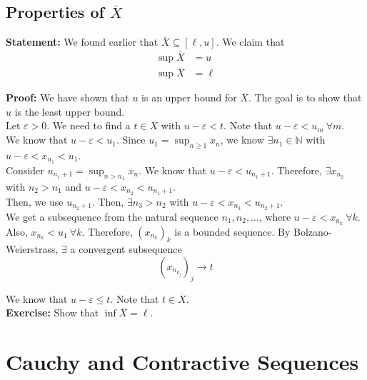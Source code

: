 \documentclass[10pt]{extarticle}
\newcommand{\N}{\mathbb{N}}
\begin{document}
  \subsection{Properties of $\overline{X}$}%
  \textbf{Statement:} We found earlier that $\overline{X} \subseteq [\ell,u]$. We claim that
    \begin{align*}
      \sup \overline{X} &= u\\
      \sup\overline{X} &= \ell
    \end{align*}

    \textbf{Proof:} We have shown that $u$ is an upper bound for $\overline{X}$. The goal is to show that $u$ is the least upper bound.\\

    Let $\varepsilon > 0$. We need to find a $t\in\overline{X}$ with $u-\varepsilon < t$. Note that $u-\varepsilon < u_m~\forall m$.\\

    We know that $u-\varepsilon < u_1$. Since $u_1 = \sup_{n\geq 1}x_n$, we know $\exists n_1\in\N$ with $u-\varepsilon < x_{n_1} < u_1$.\\

    Consider $u_{n_1+1} = \sup_{n > n_1}x_n$. We know that $u-\varepsilon < u_{n_1 + 1}$. Therefore, $\exists x_{n_2}$ with $n_2 > n_1$ and $u-\varepsilon < x_{n_2} < u_{n_1 + 1}$.\\

    Then, we use $u_{n_2 + 1}$. Then, $\exists n_3 > n_2$ with $u-\varepsilon < x_{n_3} < u_{n_2 + 1}$.\\

    We get a subsequence from the natural sequence $n_1,n_2,\dots$, where $u - \varepsilon < x_{n_k}~\forall k$.\\

    Also, $x_{n_k} < u_1~\forall k$. Therefore, $(x_{n_k})_k$ is a bounded sequence. By Bolzano-Weierstrass, $\exists$ a convergent subsequence \[\left(x_{n_{k_j}}\right)_j \rightarrow t\]

    We know that $u-\varepsilon \leq t$. Note that $t\in\overline{X}$.\\

    \textbf{Exercise:} Show that $\inf\overline{X} = \ell$.
  \section{Cauchy and Contractive Sequences}%
\end{document}
